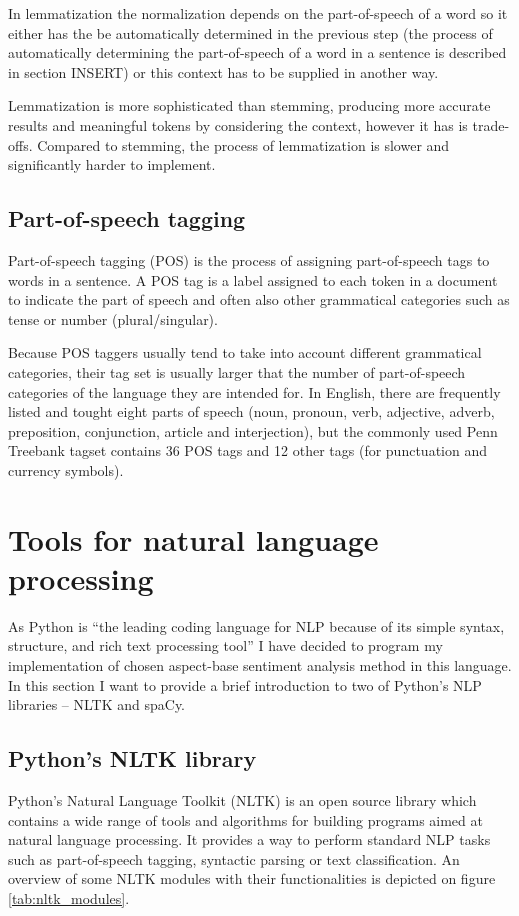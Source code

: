 In lemmatization the normalization depends on the part-of-speech of a word so it either has the be automatically determined in the previous step (the process of automatically determining the part-of-speech of a word in a sentence is described in section INSERT) or this context has to be supplied in another way. 

Lemmatization is more sophisticated than stemming, producing more accurate results and meaningful tokens by considering the context, however it has is trade-offs. Compared to stemming, the process of lemmatization is slower and significantly harder to implement.
\subsection{Part-of-speech tagging}
Part-of-speech tagging (POS) is the process of assigning part-of-speech tags to words in a sentence. A POS tag is a label assigned to each token in a document to indicate the part of speech  and often also other grammatical categories such as tense or number (plural/singular).\cite{pos}

Because POS taggers usually tend to take into account different grammatical categories, their tag set is usually larger that the number of part-of-speech categories of the language they are intended for. In English, there are frequently listed and tought eight parts of speech (noun, pronoun, verb, adjective, adverb, preposition, conjunction, article and interjection), but the commonly used Penn Treebank tagset contains 36 POS tags and 12 other tags (for punctuation and currency symbols).\cite{penn_treebank}
\section{Tools for natural language processing}
As Python is ``the leading coding language for NLP because of its simple syntax, structure, and rich text processing tool'' I have decided to program my implementation of chosen aspect-base sentiment analysis method in this language. In this section I want to provide a brief introduction to two of Python's NLP libraries -- NLTK and spaCy.
\subsection{Python's NLTK library}
Python's Natural Language Toolkit (NLTK) is an open source library which contains a wide range of tools and algorithms for building programs aimed at natural language processing. It provides a way to perform standard NLP tasks such as part-of-speech tagging, syntactic parsing or text classification. An overview of some NLTK modules with their functionalities is depicted on figure \ref{tab:nltk_modules}.

